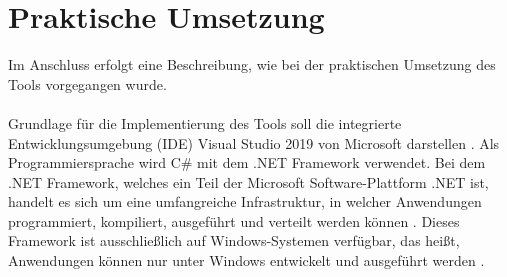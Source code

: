 \section{Praktische Umsetzung}
\vspace{0.5cm}
Im Anschluss erfolgt eine Beschreibung, wie bei der praktischen Umsetzung des Tools vorgegangen wurde. \\
\\
Grundlage für die Implementierung des Tools soll die integrierte Entwicklungsumgebung (IDE) Visual Studio 2019 von Microsoft darstellen \cite{vs}. Als Programmiersprache wird C\# mit dem .NET Framework verwendet. Bei dem .NET Framework, welches ein Teil der Microsoft Software-Plattform .NET ist, handelt es sich um eine umfangreiche Infrastruktur, in welcher Anwendungen programmiert, kompiliert, ausgeführt und verteilt werden können \cite[S.68]{bayer2008visual}. Dieses Framework ist ausschließlich auf Windows-Systemen verfügbar, das heißt, Anwendungen können nur unter Windows entwickelt und ausgeführt werden \cite{netfw}. \\
\\
